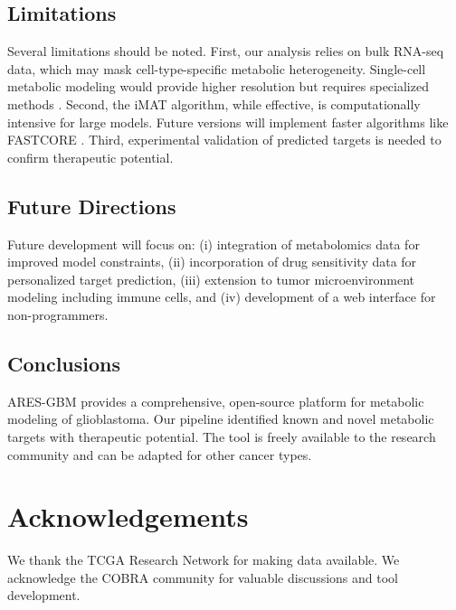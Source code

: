 \documentclass[12pt, a4paper]{article}
\begin{document}
\subsection{Limitations}

Several limitations should be noted. First, our analysis relies on bulk RNA-seq data, which may mask cell-type-specific metabolic heterogeneity. Single-cell metabolic modeling would provide higher resolution but requires specialized methods \citep{yurkovich2019quantitative}. Second, the iMAT algorithm, while effective, is computationally intensive for large models. Future versions will implement faster algorithms like FASTCORE \citep{vlassis2014fastcore}. Third, experimental validation of predicted targets is needed to confirm therapeutic potential.

\subsection{Future Directions}

Future development will focus on: (i) integration of metabolomics data for improved model constraints, (ii) incorporation of drug sensitivity data for personalized target prediction, (iii) extension to tumor microenvironment modeling including immune cells, and (iv) development of a web interface for non-programmers.

\subsection{Conclusions}

ARES-GBM provides a comprehensive, open-source platform for metabolic modeling of glioblastoma. Our pipeline identified known and novel metabolic targets with therapeutic potential. The tool is freely available to the research community and can be adapted for other cancer types.

\section*{Acknowledgements}

We thank the TCGA Research Network for making data available. We acknowledge the COBRA community for valuable discussions and tool development.

\end{document}
